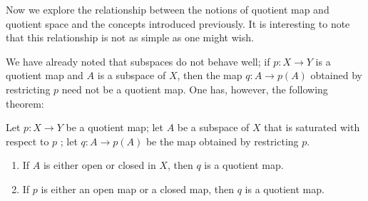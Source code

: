 Now we explore the relationship between the notions of quotient map and quotient space and the concepts introduced previously. It is interesting to note that this relationship is not as simple as one might wish.

We have already noted that subspaces do not behave well; if \(p : X \rightarrow Y\) is a quotient map and \(A\) is a subspace of \(X\), then the map \(q : A \rightarrow p( A)\) obtained by restricting \(p\) need not be a quotient map. One has, however, the following theorem:

\begin{theorem}
\label{thm:\thetheorem}
 Let \(p : X \rightarrow Y\) be a quotient map; let \(A\) be a subspace of \(X\) that is saturated with respect to \(p\) ; let \(q : A \rightarrow p( A)\) be the map obtained by restricting \(p\).

 \begin{enumerate}[itemsep=0.2em, parsep=0pt, topsep=0pt, partopsep=0pt, leftmargin=*, label=(\arabic*), align=right, widest={*(2)}]
 \item If \(A\) is either open or closed in \(X\), then \(q\) is a quotient map.

 \item[*(2)] If \(p\) is either an open map or a closed map, then \(q\) is a quotient map.
 \end{enumerate}
\end{theorem}

